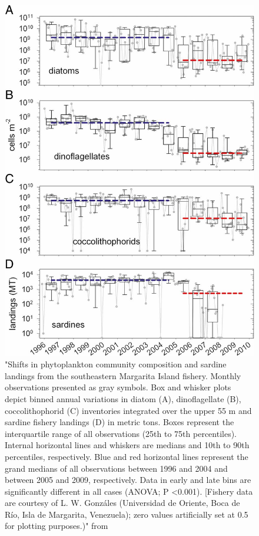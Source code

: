 \begin{figure}
\centering
\includegraphics[trim = 0mm 0mm 0mm 0mm, clip, width=0.7\linewidth]{./Chp2-Pre/Tayloretal2012_F3.large.jpg}
\caption[Scheme]{\small {"Shifts in phytoplankton community composition and sardine landings from the southeastern Margarita Island fishery. Monthly observations presented as gray symbols. Box and whisker plots depict binned annual variations in diatom (A), dinoflagellate (B), coccolithophorid (C) inventories integrated over the upper 55 m and sardine fishery landings (D) in metric tons. Boxes represent the interquartile range of all observations (25th to 75th percentiles). Internal horizontal lines and whiskers are medians and 10th to 90th percentiles, respectively. Blue and red horizontal lines represent the grand medians of all observations between 1996 and 2004 and between 2005 and 2009, respectively. Data in early and late bins are significantly different in all cases (ANOVA; P \textless 0.001). [Fishery data are courtesy of L. W. Gonzáles (Universidad de Oriente, Boca de Río, Isla de Margarita, Venezuela); zero values artificially set at 0.5 for plotting purposes.)" from \citet{Taylor2012}}}
\label{TaylorSHIFTS}
\end{figure}

